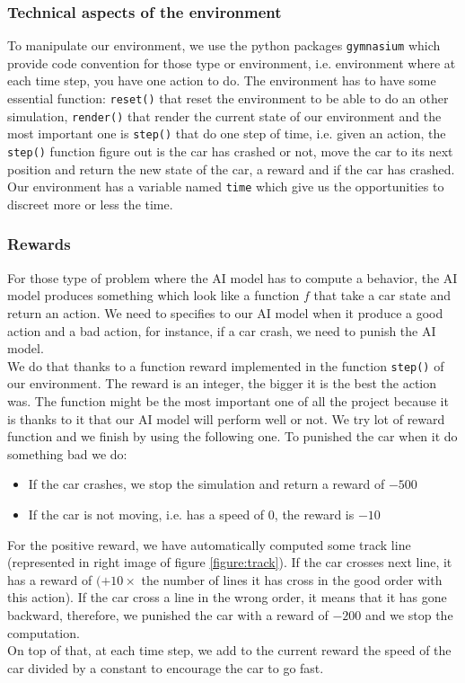 \documentclass[11pt,a4paper]{article}
\newcounter{fig}
\newcommand{\mlist}[1]{\begin{itemize}[noitemsep,topsep=0pt]#1\end{itemize}}
\begin{document}
			\subsubsection*{Technical aspects of the environment}
To manipulate our environment, we use the python packages \texttt{gymnasium} which provide code convention for those type or environment, i.e. environment where at each time step, you have one action to do. The environment has to have some essential function: \texttt{reset()} that reset the environment to be able to do an other simulation, \texttt{render()} that render the current state of our environment and the most important one is \texttt{step()} that do one step of time, i.e. given an action, the \texttt{step()} function figure out is the car has crashed or not, move the car to its next position and return the new state of the car, a reward and if the car has crashed.\\
Our environment has a variable named \texttt{time} which give us the opportunities to discreet more or less the time.
		
			\subsubsection*{Rewards}
For those type of problem where the AI model has to compute a behavior, the AI model produces something which look like a function $f$ that take a car state and return an action. We need to specifies to our AI model when it produce a good action and a bad action, for instance, if a car crash, we need to punish the AI model.\\
We do that thanks to a function reward implemented in the function \texttt{step()} of our environment. The reward is an integer, the bigger it is the best the action was. The function might be the most important one of all the project because it is thanks to it that our AI model will perform well or not. We try lot of reward function and we finish by using the following one. To punished the car when it do something bad we do:
\mlist{
\item If the car crashes, we stop the simulation and return a reward of $-500$
\item If the car is not moving, i.e. has a speed of $0$, the reward is $-10$
}
For the positive reward, we have automatically computed some track line (represented in right image of figure \ref{figure:track}). If the car crosses next line, it has a reward of $(+10\times$ the number of lines it has cross in the good order with this action). If the car cross a line in the wrong order, it means that it has gone backward, therefore, we punished the car with a reward of $-200$ and we stop the computation.\\
On top of that, at each time step, we add to the current reward the speed of the car divided by a constant to encourage the car to go fast.
\end{document}
